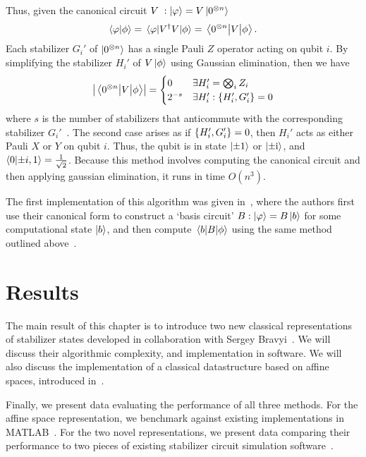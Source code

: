 Thus, given the canonical circuit $V\; : \ket{\varphi}=V\ket{0^{\otimes n}}$
\begin{equation}
\braket{\varphi}{\phi} = \matrixel{\varphi}{V^{\dagger}V}{\phi} = \matrixel{0^{\otimes n}}{V}{\phi}.
\end{equation}
Each stabilizer $G_{i}'$ of $\ket{0^{\otimes n}}$ has a single Pauli $Z$ operator acting on qubit $i$. By simplifying the stabilizer $H_{i}'$ of $V\ket{\phi}$ using Gaussian elimination, then we have
\begin{equation}
\left\vert \matrixel{0^{\otimes n}}{V}{\phi}\right\vert = \begin{cases}
 0 & \exists H_{i}' = \bigotimes_{i}Z_{i}\\
 2^{-s} & \exists H_{i}' : \acomm{H_{i}'}{G_{i}'} = 0
\end{cases}
\end{equation}
where $s$ is the number of stabilizers that anticommute with the corresponding stabilizer $G_{i}'$~\cite{Aaronson2004}. The second case arises as if $\acomm{H_{i}'}{G_{i}'} = 0$, then $H_{i}'$ acts as either Pauli $X$ or $Y$ on qubit $i$. Thus, the qubit is in state $\ket{\pm 1}$ or $\ket{\pm\mathrm{i}}$, and $\braket{0}{\pm i,1}=\frac{1}{\sqrt{2}}$. Because this method involves computing the canonical circuit and then applying gaussian elimination, it runs in time $O(n^{3})$.\par
The first implementation of this algorithm was given in~\cite{Garcia2012}, where the authors first use their canonical form to construct a `basis circuit' $B : \ket{\varphi}=B\ket{b}$ for some computational state $\ket{b}$, and then compute $\matrixel{b}{B}{\phi}$ using the same method outlined above~\cite{Garcia2012}.
\section{Results}
The main result of this chapter is to introduce two new classical representations of stabilizer states developed in collaboration with Sergey Bravyi~\cite{Bravyi2018}. We will discuss their algorithmic complexity, and implementation in software. We will also discuss the implementation of a classical datastructure based on affine spaces, introduced in~\cite{Bravyi2016}.\par
Finally, we  present data evaluating the performance of all three methods. For the affine space representation, we benchmark against existing implementations in MATLAB~\cite{Bravyi2016}. For the two novel representations, we present data comparing their performance to two pieces of existing stabilizer circuit simulation software~\cite{Aaronson2004,Anders2006}.
